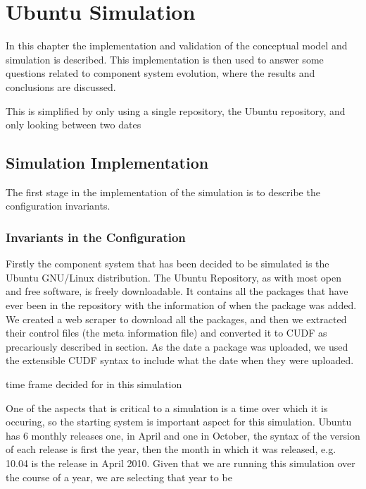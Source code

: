 
\chapter{Ubuntu Simulation}
\label{ubunutsimulation}
{}In this chapter the implementation and validation of the conceptual model and simulation is described.
{}This implementation is then used to answer some questions related to component system evolution, where the results and conclusions are discussed.


{}This is simplified by only using a single repository, the Ubuntu repository, and only looking between two dates 



\section{Simulation Implementation}
The first stage in the implementation of the simulation is to describe the configuration invariants.

\subsection{Invariants in the Configuration}

Firstly the component system that has been decided to be simulated is the Ubuntu GNU/Linux distribution.
The Ubuntu Repository, as with most open and free software, is freely downloadable.
It contains all the packages that have ever been in the repository with the information of when the package was added.
We created a web scraper to download all the packages, and then we extracted their control files (the meta information file) and converted it to CUDF as precariously described in section. %
As the date a package was uploaded, we used the extensible CUDF syntax to include what the date when they were uploaded.

time frame decided for in this simulation 

One of the aspects that is critical to a simulation is a time over which it is occuring, 
so the starting system is important aspect for this simulation.
Ubuntu has 6 monthly releases one, in April and one in October, the syntax of the version of each release is first the year,
then the month in which it was released, e.g. 10.04 is the release in April 2010.
Given that we are running this simulation over the course of a year, we are selecting that year to be 

